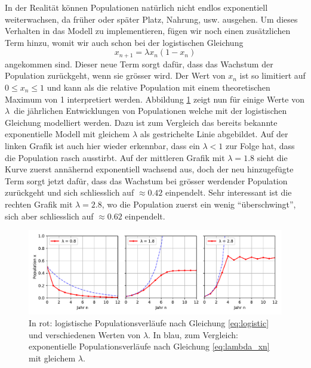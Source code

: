 In der Realität können Populationen natürlich nicht endlos
exponentiell weiterwachsen, 
da früher oder später Platz, Nahrung, usw. ausgehen.
Um dieses Verhalten in das Modell zu implementieren,
fügen wir noch einen zusätzlichen Term hinzu, 
womit wir auch schon bei der logistischen Gleichung 
\begin{equation}
    \label{eq:logistic}
    x_{n+1} = \lambda x_{n} (1 - x_{n})
\end{equation}
angekommen sind.
Dieser neue Term sorgt dafür, 
dass das Wachstum der Population zurückgeht, 
wenn sie grösser wird.
Der Wert von $x_n$ ist so limitiert auf 
$0 \le x_n \le 1$  
und kann als die relative Population mit einem
theoretischen Maximum von 1 interpretiert werden. 
Abbildung \ref{fig:pop_logistic} zeigt nun
für einige Werte von $\lambda$\
die jährlichen Entwicklungen von Populationen 
welche mit der logistischen Gleichung modelliert werden.
Dazu ist zum Vergleich das bereits bekannte exponentielle Modell
mit gleichem $\lambda$ als gestrichelte Linie abgebildet. 
Auf der linken Grafik ist auch hier wieder erkennbar, 
dass ein $\lambda < 1$ zur Folge hat, 
dass die Population rasch ausstirbt. 
Auf der mittleren Grafik mit $\lambda = 1.8$ sieht 
die Kurve zuerst annähernd exponentiell wachsend aus,
doch der neu hinzugefügte Term sorgt jetzt dafür, 
dass das Wachstum bei grösser werdender Population zurückgeht 
und sich schliesslich auf $\approx 0.42$ einpendelt. 
Sehr interessant ist die rechten Grafik mit $\lambda = 2.8$,
wo die Population zuerst ein wenig ``überschwingt'', 
sich aber schliesslich auf $\approx 0.62$ einpendelt.  
\begin{figure}
    \includegraphics[width=\linewidth]{papers/logistic/figures/pop_logistic.pdf}
    \caption{
        In rot:
        logistische Populationsverläufe nach
        Gleichung \eqref{eq:logistic} und
        verschiedenen Werten von $\lambda$.
        In blau, zum Vergleich:
        exponentielle Populationsverläufe nach 
        Gleichung \eqref{eq:lambda_xn} mit gleichem $\lambda$.
    }
    \label{fig:pop_logistic}
\end{figure}